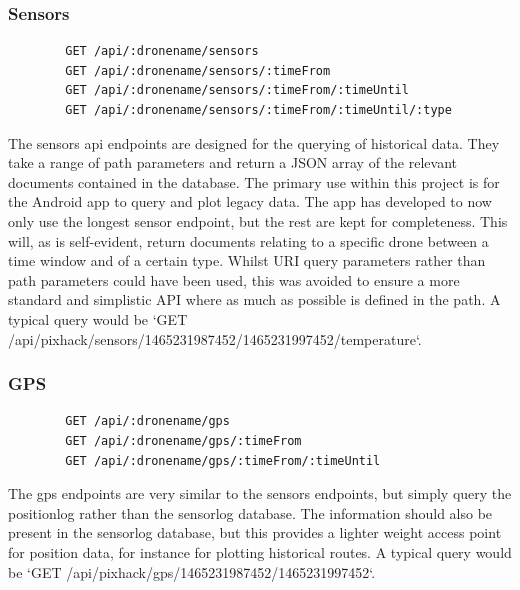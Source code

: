 \documentclass{article}
\begin{document}
\subsubsection{Sensors}
\begin{center}
	\begin{lstlisting}
		GET /api/:dronename/sensors
		GET /api/:dronename/sensors/:timeFrom
		GET /api/:dronename/sensors/:timeFrom/:timeUntil
		GET /api/:dronename/sensors/:timeFrom/:timeUntil/:type
	\end{lstlisting}
\end{center}
The sensors api endpoints are designed for the querying of historical data. They take a range of path parameters and return a JSON array of the relevant documents contained in the database. The primary use within this project is for the Android app to query and plot legacy data. The app has developed to now only use the longest sensor endpoint, but the rest are kept for completeness. This will, as is self-evident, return documents relating to a specific drone between a time window and of a certain type. Whilst URI query parameters rather than path parameters could have been used, this was avoided to ensure a more standard and simplistic API where as much as possible is defined in the path. A typical query would be `GET /api/pixhack/sensors/1465231987452/1465231997452/temperature`.

\subsubsection{GPS}
\begin{center}
	\begin{lstlisting}
		GET /api/:dronename/gps
		GET /api/:dronename/gps/:timeFrom
		GET /api/:dronename/gps/:timeFrom/:timeUntil
	\end{lstlisting}
\end{center}
The gps endpoints are very similar to the sensors endpoints, but simply query the positionlog rather than the sensorlog database. The information should also be present in the sensorlog database, but this provides a lighter weight access point for position data, for instance for plotting historical routes. A typical query would be `GET /api/pixhack/gps/1465231987452/1465231997452`.
\end{document}

